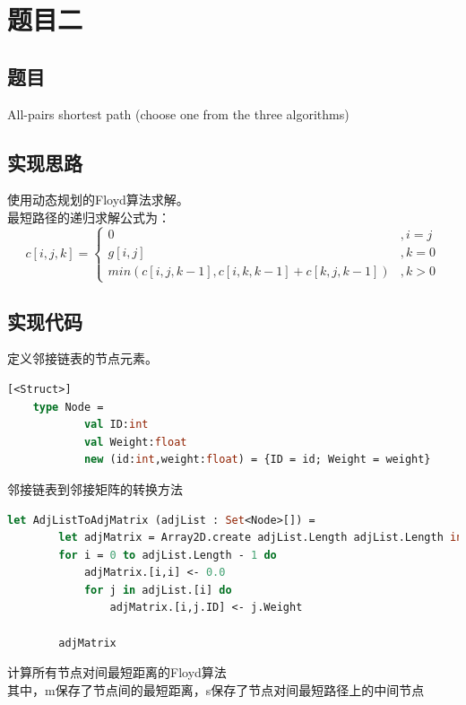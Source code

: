 \documentclass[a4paper]{article}
\begin{document}
\section{题目二}

\subsection{题目}

All-pairs shortest path (choose one from the three algorithms)

\subsection{实现思路}

使用动态规划的Floyd算法求解。\\
最短路径的递归求解公式为：
\[c[i,j,k]=
    \left\{
        \begin{array}{ll}
            0 & ,i=j\\
            g[i,j] & ,k=0\\
            min(c[i,j,k-1],c[i,k,k-1]+c[k,j,k-1]) & ,k>0
        \end{array}
    \right.
\]
\subsection{实现代码}

定义邻接链表的节点元素。

\begin{lstlisting}[language=ML]
    [<Struct>]
    type Node = 
            val ID:int
            val Weight:float
            new (id:int,weight:float) = {ID = id; Weight = weight}
\end{lstlisting}

邻接链表到邻接矩阵的转换方法

\begin{lstlisting}[language=ML]
    let AdjListToAdjMatrix (adjList : Set<Node>[]) =
        let adjMatrix = Array2D.create adjList.Length adjList.Length infinity
        for i = 0 to adjList.Length - 1 do
            adjMatrix.[i,i] <- 0.0
            for j in adjList.[i] do
                adjMatrix.[i,j.ID] <- j.Weight
        
        adjMatrix
\end{lstlisting}

计算所有节点对间最短距离的Floyd算法\\
其中，m保存了节点间的最短距离，s保存了节点对间最短路径上的中间节点
\end{document}
